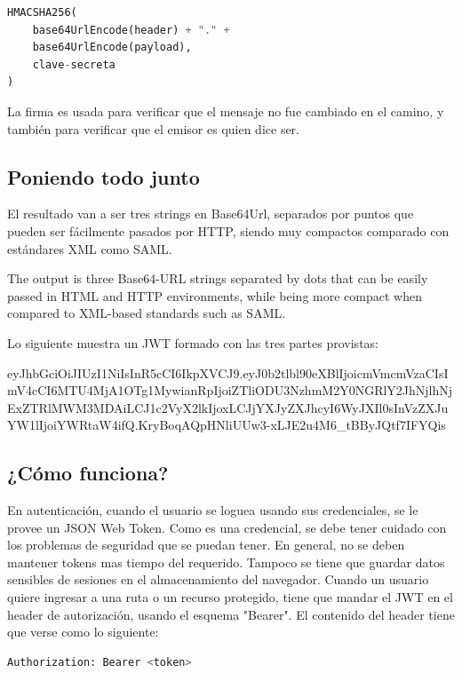 \begin{lstlisting}[language=Python]
HMACSHA256(
    base64UrlEncode(header) + "." +
    base64UrlEncode(payload),
    clave-secreta
)
\end{lstlisting}
La firma es usada para verificar que el mensaje no fue cambiado en el camino, y también para verificar que el emisor es quien dice ser.

\subsection[Poniendo todo junto]{Poniendo todo junto}

El resultado van a ser tres strings en Base64Url, separados por puntos que pueden ser fácilmente pasados por HTTP, siendo muy compactos comparado con estándares XML como SAML.

The output is three Base64-URL strings separated by dots that can be easily passed in HTML and HTTP environments, while being more compact when compared to XML-based standards such as SAML.

Lo siguiente muestra un JWT formado con las tres partes provistas:


eyJhbGciOiJIUzI1NiIsInR5cCI6IkpXVCJ9.\break eyJ0b2tlbl90eXBlIjoicmVmcmVzaCIsImV4cCI6MTU4MjA1OTg1MywianRpIj\break oiZTliODU3NzhmM2Y0NGRlY2JhNjlhNjExZTRlMWM3MDAiLCJ1c2VyX2lkIj\break oxLCJjYXJyZXJhcyI6WyJXIl0sInVzZXJuYW1lIjoiYWRtaW4ifQ.\break KryBoqAQpHNliUUw3-xLJE2u4M6_tBByJQtf7IFYQis



\subsection[¿Cómo funciona?]{¿Cómo funciona?}

En autenticación, cuando el usuario se loguea usando sus credenciales, se le provee un JSON Web Token. Como es una credencial, se debe tener cuidado con los problemas de seguridad que se puedan tener. En general, no se deben mantener tokens mas tiempo del requerido. Tampoco se tiene que guardar datos sensibles de sesiones en el almacenamiento del navegador.
Cuando un usuario quiere ingresar a una ruta o un recurso protegido, tiene que mandar el JWT en el header de autorización, usando el esquema "Bearer". El contenido del header tiene que verse como lo siguiente:
\begin{lstlisting}[language=Python]
Authorization: Bearer <token>
\end{lstlisting}


